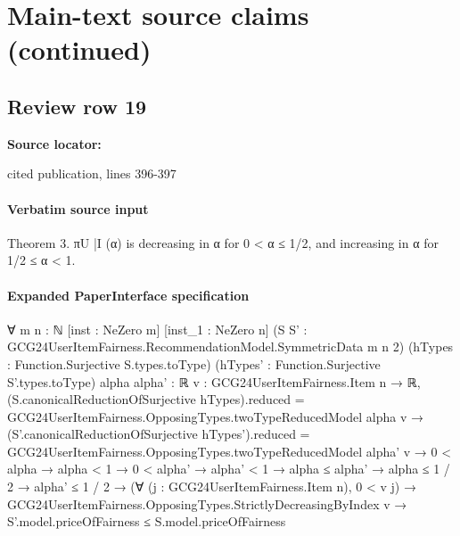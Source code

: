 \documentclass[10pt]{article}
\begin{document}
\section*{Main-text source claims (continued)}
\subsection*{Review row 19}
\textbf{Source locator:} {\footnotesize\raggedright cited publication, lines 396-\allowbreak{}397\par}
\paragraph{Verbatim source input}
\begin{ReviewVerbatim}
Theorem 3. πU
|I (α) is decreasing in α for 0 < α ≤ 1/2, and increasing in α for 1/2 ≤ α < 1.
\end{ReviewVerbatim}



\paragraph{Expanded PaperInterface specification}
\begin{ReviewVerbatim}
∀ {m n : ℕ} [inst : NeZero m] [inst_1 : NeZero n] (S S' : GCG24UserItemFairness.RecommendationModel.SymmetricData m n 2)
  (hTypes : Function.Surjective S.types.toType) (hTypes' : Function.Surjective S'.types.toType) {alpha alpha' : ℝ}
  {v : GCG24UserItemFairness.Item n → ℝ},
  (S.canonicalReductionOfSurjective hTypes).reduced = GCG24UserItemFairness.OpposingTypes.twoTypeReducedModel alpha v →
    (S'.canonicalReductionOfSurjective hTypes').reduced =
        GCG24UserItemFairness.OpposingTypes.twoTypeReducedModel alpha' v →
      0 < alpha →
        alpha < 1 →
          0 < alpha' →
            alpha' < 1 →
              alpha ≤ alpha' →
                alpha ≤ 1 / 2 →
                  alpha' ≤ 1 / 2 →
                    (∀ (j : GCG24UserItemFairness.Item n), 0 < v j) →
                      GCG24UserItemFairness.OpposingTypes.StrictlyDecreasingByIndex v →
                        S'.model.priceOfFairness ≤ S.model.priceOfFairness
\end{ReviewVerbatim}
\end{document}
